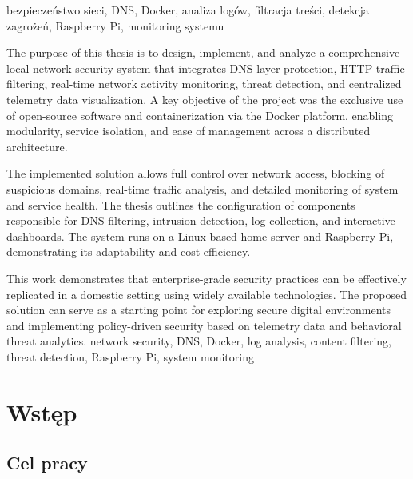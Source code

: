 \documentclass[
    left=2.5cm,         %
    right=2.5cm,        %
    top=2.5cm,          %
    bottom=3cm,         %
    bindingoffset=6mm,  %
    nohyphenation=true %
]{eiti/eiti-thesis} %
\begin{document}
\slowakluczowe bezpieczeństwo sieci, DNS, Docker, analiza logów, filtracja treści, detekcja zagrożeń, Raspberry Pi, monitoring systemu

\newpage

\abstract The purpose of this thesis is to design, implement, and analyze a comprehensive local network security system that integrates DNS-layer protection, HTTP traffic filtering, real-time network activity monitoring, threat detection, and centralized telemetry data visualization. A key objective of the project was the exclusive use of open-source software and containerization via the Docker platform, enabling modularity, service isolation, and ease of management across a distributed architecture.

The implemented solution allows full control over network access, blocking of suspicious domains, real-time traffic analysis, and detailed monitoring of system and service health. The thesis outlines the configuration of components responsible for DNS filtering, intrusion detection, log collection, and interactive dashboards. The system runs on a Linux-based home server and Raspberry Pi, demonstrating its adaptability and cost efficiency.

This work demonstrates that enterprise-grade security practices can be effectively replicated in a domestic setting using widely available technologies. The proposed solution can serve as a starting point for exploring secure digital environments and implementing policy-driven security based on telemetry data and behavioral threat analytics.
\keywords network security, DNS, Docker, log analysis, content filtering, threat detection, Raspberry Pi, system monitoring
\newpage


\thispagestyle{empty}
\tableofcontents

\newpage 
\section{Wstęp}
\subsection{Cel pracy}
\end{document}
